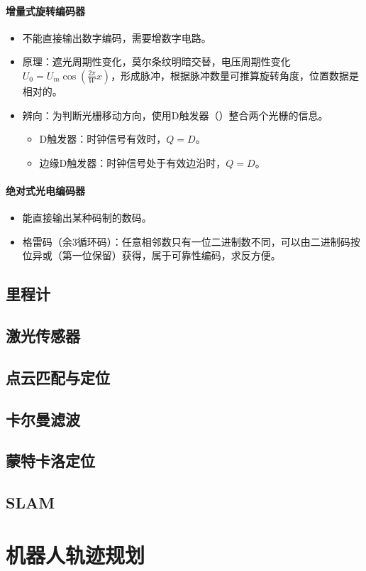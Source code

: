 \documentclass[
12pt, %
a4paper, 
oneside, %
headinclude,footinclude, %
]{scrartcl}
\begin{document}
\paragraph{增量式旋转编码器}
\begin{itemize}
\item 不能直接输出数字编码，需要增数字电路。
\item 原理：遮光周期性变化，莫尔条纹明暗交替，电压周期性变化$ U_0 = U_m \cos(\frac{2\pi}{W}x) $，形成脉冲，根据脉冲数量可推算旋转角度，位置数据是相对的。
\item 辨向：为判断光栅移动方向，使用D触发器（）整合两个光栅的信息。
\begin{itemize}
\item D触发器：时钟信号有效时，$ Q = D $。
\item 边缘D触发器：时钟信号处于有效边沿时，$ Q = D $。
\end{itemize}
\end{itemize}
\paragraph{绝对式光电编码器}
\begin{itemize}
\item 能直接输出某种码制的数码。
\item 格雷码（余$ 3 $循环码）：任意相邻数只有一位二进制数不同，可以由二进制码按位异或（第一位保留）获得，属于可靠性编码，求反方便。
\end{itemize}
\subsection[里程计]{里程计}
\subsection[激光传感器]{激光传感器}
\subsection[点云匹配与定位]{点云匹配与定位}
\subsection[卡尔曼滤波]{卡尔曼滤波}
\subsection[蒙特卡洛定位]{蒙特卡洛定位}
\subsection[SLAM]{SLAM}
\section{机器人轨迹规划}
\end{document}

